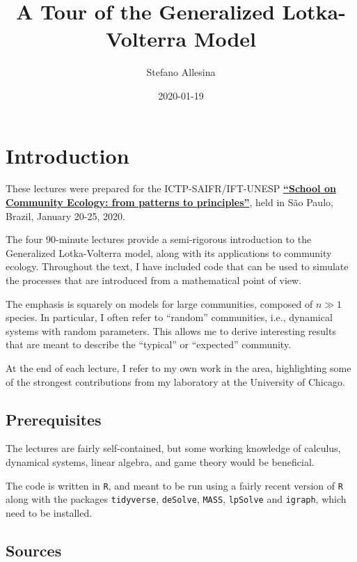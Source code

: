 \documentclass[]{book}
\title{A Tour of the Generalized Lotka-Volterra Model}
\author{Stefano Allesina}
\date{2020-01-19}
\begin{document}
\maketitle

{
\setcounter{tocdepth}{1}
\tableofcontents
}
\hypertarget{introduction}{%
\chapter{Introduction}\label{introduction}}

These lectures were prepared for the ICTP-SAIFR/IFT-UNESP \href{https://www.ictp-saifr.org/community-ecology-from-patterns-to-principles/}{\textbf{``School on Community Ecology: from patterns to principles''}}, held in São Paulo, Brazil, January 20-25, 2020.

The four 90-minute lectures provide a semi-rigorous introduction to the Generalized Lotka-Volterra model, along with its applications to community ecology. Throughout the text, I have included code that can be used to simulate the processes that are introduced from a mathematical point of view.

The emphasis is squarely on models for large communities, composed of \(n \gg 1\) species. In particular, I often refer to ``random'' communities, i.e., dynamical systems with random parameters. This allows me to derive interesting results that are meant to describe the ``typical'' or ``expected'' community.

At the end of each lecture, I refer to my own work in the area, highlighting some of the strongest contributions from my laboratory at the University of Chicago.

\hypertarget{prerequisites}{%
\section{Prerequisites}\label{prerequisites}}

The lectures are fairly self-contained, but some working knowledge of calculus, dynamical systems, linear algebra, and game theory would be beneficial.

The code is written in \texttt{R}, and meant to be run using a fairly recent version of \texttt{R} along with the packages \texttt{tidyverse}, \texttt{deSolve}, \texttt{MASS}, \texttt{lpSolve} and \texttt{igraph}, which need to be installed.

\hypertarget{sources}{%
\section{Sources}\label{sources}}
\end{document}
